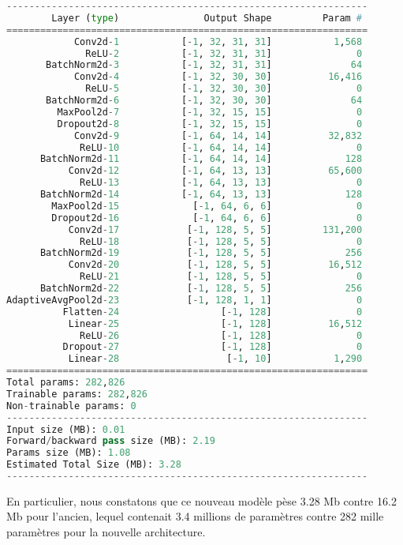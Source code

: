 \documentclass[12pt,a4paper]{article}
\begin{document}
\begin{lstlisting}[language=Python]
    ----------------------------------------------------------------
        Layer (type)               Output Shape         Param #
================================================================
            Conv2d-1           [-1, 32, 31, 31]           1,568
              ReLU-2           [-1, 32, 31, 31]               0
       BatchNorm2d-3           [-1, 32, 31, 31]              64
            Conv2d-4           [-1, 32, 30, 30]          16,416
              ReLU-5           [-1, 32, 30, 30]               0
       BatchNorm2d-6           [-1, 32, 30, 30]              64
         MaxPool2d-7           [-1, 32, 15, 15]               0
         Dropout2d-8           [-1, 32, 15, 15]               0
            Conv2d-9           [-1, 64, 14, 14]          32,832
             ReLU-10           [-1, 64, 14, 14]               0
      BatchNorm2d-11           [-1, 64, 14, 14]             128
           Conv2d-12           [-1, 64, 13, 13]          65,600
             ReLU-13           [-1, 64, 13, 13]               0
      BatchNorm2d-14           [-1, 64, 13, 13]             128
        MaxPool2d-15             [-1, 64, 6, 6]               0
        Dropout2d-16             [-1, 64, 6, 6]               0
           Conv2d-17            [-1, 128, 5, 5]         131,200
             ReLU-18            [-1, 128, 5, 5]               0
      BatchNorm2d-19            [-1, 128, 5, 5]             256
           Conv2d-20            [-1, 128, 5, 5]          16,512
             ReLU-21            [-1, 128, 5, 5]               0
      BatchNorm2d-22            [-1, 128, 5, 5]             256
AdaptiveAvgPool2d-23            [-1, 128, 1, 1]               0
          Flatten-24                  [-1, 128]               0
           Linear-25                  [-1, 128]          16,512
             ReLU-26                  [-1, 128]               0
          Dropout-27                  [-1, 128]               0
           Linear-28                   [-1, 10]           1,290
================================================================
Total params: 282,826
Trainable params: 282,826
Non-trainable params: 0
----------------------------------------------------------------
Input size (MB): 0.01
Forward/backward pass size (MB): 2.19
Params size (MB): 1.08
Estimated Total Size (MB): 3.28
----------------------------------------------------------------
\end{lstlisting}
En particulier, nous constatons que ce nouveau modèle pèse 3.28 Mb contre 16.2 Mb pour l'ancien, lequel contenait 3.4 millions de paramètres contre 282 mille paramètres pour la nouvelle architecture.
\end{document}
